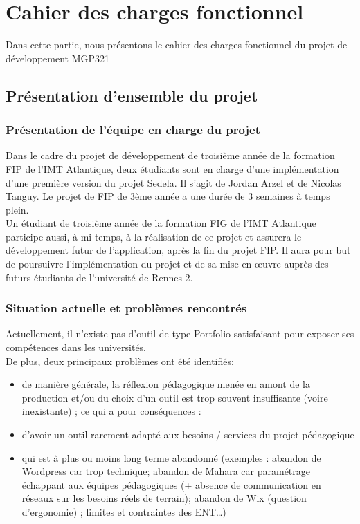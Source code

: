 \chapter{Cahier des charges fonctionnel}

Dans cette partie, nous présentons le cahier des charges fonctionnel du projet de développement \gls{MGP321}

\section{Présentation d'ensemble du projet}

\subsection{Présentation de l’équipe en charge du projet}

Dans le cadre du projet de développement de troisième année de la formation FIP de l’IMT Atlantique, deux étudiants sont en charge d’une implémentation d’une première version du projet Sedela. Il s’agit de Jordan Arzel et de Nicolas Tanguy. Le projet de FIP de 3ème année a une durée de 3 semaines à temps plein. \\

Un étudiant de troisième année de la formation FIG de l’IMT Atlantique participe aussi, à mi-temps, à la réalisation de ce projet et assurera le développement futur de l’application, après la fin du projet FIP. Il aura pour but de poursuivre l’implémentation du projet et de sa mise en œuvre auprès des futurs étudiants de l’université de Rennes 2.

\subsection{Situation actuelle et problèmes rencontrés}

Actuellement, il n’existe pas d’outil de type Portfolio satisfaisant pour exposer ses compétences dans les universités. \\

De plus, deux principaux problèmes ont été identifiés: \\

\begin{itemize}
    \item de manière générale, la réflexion pédagogique menée en amont de la production et/ou du choix d’un outil est trop souvent insuffisante (voire inexistante) ; ce qui a pour conséquences :
    \item d’avoir un outil rarement adapté aux besoins / services du projet pédagogique
    \item qui est à plus ou moins long terme abandonné (exemples : abandon de Wordpress car trop technique; abandon de Mahara car paramétrage échappant aux équipes pédagogiques (+ absence de communication en réseaux sur les besoins réels de terrain); abandon de Wix (question d’ergonomie) ; limites et contraintes des ENT…)
\end{itemize}


